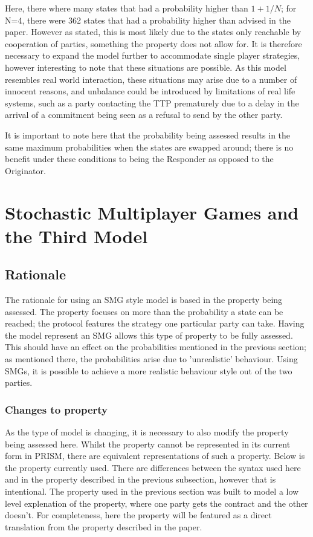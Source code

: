 \documentclass{l4proj}
\begin{document}
Here, there where many states that had a probability higher than $1+1/N$; for N=4, there were 362 states that had a probability higher than advised in the paper. However as stated, this is most likely due to the states only reachable by cooperation of parties, something the property does not allow for. It is therefore necessary to expand the model further to accommodate single player strategies, however interesting to note that these situations are possible. As this model resembles real world interaction, these situations may arise due to a number of innocent reasons, and unbalance could be introduced by limitations of real life systems, such as a party contacting the TTP prematurely due to a delay in the arrival of a commitment being seen as a refusal to send by the other party.


It is important to note here that the probability being assessed results in the same maximum probabilities when the states are swapped around; there is no benefit under these conditions to being the Responder as opposed to the Originator.

\chapter{Stochastic Multiplayer Games and the Third Model}

\section{Rationale}

The rationale for using an SMG style model is based in the property being assessed. The property focuses on more than the probability a state can be reached; the protocol features the strategy one particular party can take. Having the model represent an SMG allows this type of property to be fully assessed.
This should have an effect on the probabilities mentioned in the previous section; as mentioned there, the probabilities arise due to 'unrealistic' behaviour. Using SMGs, it is possible to achieve a more realistic behaviour style out of the two parties.


\subsection{Changes to property}

As the type of model is changing, it is necessary to also modify the property being assessed here. Whilst the property cannot be represented in its current form in PRISM, there are equivalent representations of such a property. Below is the property currently used. There are differences between the syntax used here and in the property described in the previous subsection, however that is intentional. The property used in the previous section was built to model a low level explenation of the property, where one party gets the contract and the other doesn't. For completeness, here the property will be featured as a direct translation from the property described in the paper. 
\end{document}
